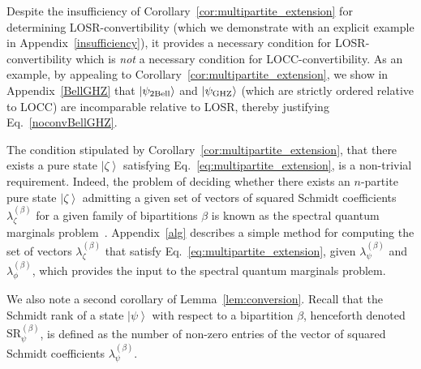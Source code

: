 \documentclass[12pt]{article}
\newcommand{\ket}[1]{\left| #1 \right>}
\theoremstyle{plain}
\theoremstyle{definition}
\begin{document}
Despite the insufficiency of Corollary~\ref{cor:multipartite_extension} for determining LOSR-convertibility (which we demonstrate with an explicit example in Appendix~\ref{insufficiency}), it provides a necessary condition for LOSR-convertibility which
 is {\em not} a necessary condition for LOCC-convertibility.
  As an example, by appealing to Corollary~\ref{cor:multipartite_extension}, we show in Appendix~\ref{BellGHZ} that $\ket{\psi_{\rm 2Bell}}$ and $\ket{\psi_{\rm GHZ}}$ (which are strictly ordered relative to LOCC) are incomparable relative to LOSR, thereby justifying Eq.~\eqref{noconvBellGHZ}. 

The condition stipulated by Corollary~\ref{cor:multipartite_extension}, that there exists a pure state $\ket{\zeta}$ satisfying Eq.~\eqref{eq:multipartite_extension},
is a non-trivial requirement. Indeed, the problem of deciding whether there exists an $n$-partite pure state $\ket{\zeta}$ admitting a given set of vectors of squared Schmidt coefficients $\lambda^{(\beta)}_{\zeta}$ for a given
 family of bipartitions $\beta$ is known as the spectral quantum marginals problem~\cite{klyachko2006quantum,walter2013entanglement}.
Appendix~\ref{alg} describes a simple method for computing  the set of vectors $\lambda_{\zeta}^{(\beta)}$ that satisfy Eq.~\eqref{eq:multipartite_extension}, given $\lambda_{\psi}^{(\beta)}$ and $\lambda_{\phi}^{(\beta)}$, which provides the input to the spectral quantum marginals problem.

We also note a second corollary of Lemma~\ref{lem:conversion}.
 Recall that the Schmidt rank of a state $\ket{\psi}$ with respect to a bipartition $\beta$, henceforth denoted $\mathrm{SR}_{\psi}^{(\beta)}$, is defined as the 
number of non-zero entries of the vector of squared Schmidt coefficients $\lambda_{\psi}^{(\beta)}$.
\end{document}
